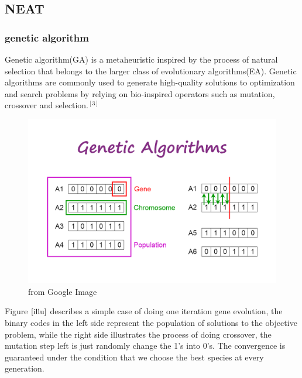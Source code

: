 \documentclass{article}
\begin{document}
\subsection{NEAT}
\subsubsection{genetic algorithm}

Genetic algorithm(GA) is a metaheuristic inspired by the process of natural selection that belongs to the larger class of evolutionary algorithms(EA).
Genetic algorithms are commonly used to generate high-quality solutions to optimization and search problems by relying on bio-inspired operators such as mutation, crossover and selection.$^{[3]}$
\begin{figure}[htbp]
  \centering
  \includegraphics[width = .7\textwidth]{illu.png}
  \caption{from Google Image}
  \label{illu}
\end{figure}
Figure $\ref{illu}$ describes a simple case of doing one iteration gene evolution, the binary codes in the left side represent the population of solutions to the objective problem, while the right side
illustrates the process of doing crossover, the mutation step left is just randomly change the 1's into 0's. The convergence is guaranteed under the condition that we choose the best species at 
every generation.
\end{document}
